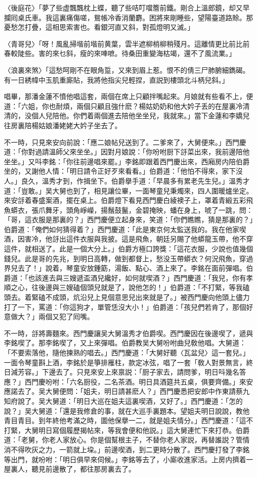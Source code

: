 〈後庭花〉「夢了些虚飄飄枕上蝶，聽了些咭叮噹簷前鐵。剛合上溫郎鏡，却又早攔囘桌氏車。我這裏痛傷嗟，鴛帳冷香消蘭麝。困將來剛睡些，望陽臺道路賒。那憂愁怎打疊，這相思索害也。看銀河直又斜，對孤燈明又滅。」

〈青哥兒〉「呀！風亂掃堦前堦前黄葉，雲半遮柳梢柳稍殘月。這離情更比前比前春較陡些。害的來乜斜，瘦的來唓嗻。待桑田重變海枯竭，還不了風流業。」

〈浪裏來煞〉「這愁呵剛不在眼角踅，又來到眉上惹。恨不的倩三尸肺腑細鐫碣。有一日綉幃中玉肌重廝貼，我將他指尖兒輕捏，直説到樓頭北斗柄兒斜。」

唱畢，那潘金蓮不憤他唱這套，兩個在席上只顧拌嘴起來。月娘就有些看不上，便道：「六姐，你也耐煩，兩個只顧且強什麽？楊姑奶奶和他大妗子丢的在屋裏冷清清的，没個人兒陪他。你們着兩個進去陪他坐坐兒，我就來。」當下金蓮和李嬌兒往房裏陪楊姑娘潘姥姥大妗子坐去了。

不一時，只見來安向前說：「應二娘帖兒送到了。二爹來了，大舅便來。」西門慶道：「你對過請溫師父來坐坐。」因對月娘說：「你吩咐厨下㧱菜出來，我前邊陪他坐坐。」又呌李銘：「你往前邊唱來罷。」李銘即跟着西門慶出來，西廂房内陪伯爵坐的，又謝他人情：「明日請令正好歹來看看。」伯爵道：「他怕不得來，家下沒人。」良久，溫秀才到，作揖坐下。伯爵擧手道：「早晨多有累老先生兒。」溫秀才道：「豈敢。」吴大舅也到了，相見讓位畢，一面琴童兒秉燭來，四人圍暖爐坐定。來安㧱着春盛案酒，擺在桌上。伯爵燈下看見西門慶白綾襖子上，罩着青緞五彩飛魚蟒衣，張爪舞牙，頭角崢嶸，揚鬚鼓鬣，金碧掩映，蟠在身上，唬了一跳，問：「哥，這衣服是那裏的？」西門慶便立起身來，笑道：「你們瞧瞧，猜是那裏的？」伯爵道：「俺們如何猜得着？」西門慶道：「此是東京何太監送我的。我在他家喫酒，因害冷，他㧱出這件衣服與我披。這是飛魚，朝廷另賜了他蟒龍玉帶，他不穿這件，就相送了。此是一個大分上。」伯爵方極口誇獎：「這花衣服，少說也值幾個錢兒。此是哥的先兆，到明日高轉，做到都督上，愁没玉帶蟒衣？何況飛魚，穿過界兒去了！」說着，琴童安放鍾筯，湯飯、點心、酒上來了。李銘在面前彈唱。伯爵道：「也該進去與三嫂遞盃酒兒纔好，如何就喫酒？」西門慶道：「我兒，你有孝順之心，往後邊與三嫂磕個頭兒就是了，說他怎的！」伯爵道：「不打緊，等我磕頭去。着緊磕不成頭，炕沿兒上見個意思兒出來就是了。」被西門慶向他頭上儘力打了一下，罵道：「你這狗才，單管恁沒大小！」伯爵道：「孩兒們若肯了，那個好意做大？」兩個又犯了囘嘴。

不一時，㧱將壽麵來。西門慶讓吴大舅溫秀才伯爵喫。西門慶因在後邊喫了，遞與李銘喫了。那李銘喫了，又上來彈唱。伯爵教吴大舅吩咐曲兒敎他唱。大舅道：「不要索落他，隨他揀熟的唱去。」西門慶道：「大舅好聽〈瓦盆兒〉這一套兒。」一面令琴童斟上酒，李銘於是箏排雁柱，款定冰弦，唱了一套「敎人對景無言，終日減芳容。」下邊去了。只見來安上來禀説：「厨子家去，請問爹，明日呌幾名答應？」西門慶吩咐：「六名厨役，二名茶酒。明日具酒筵共五桌，俱要齊備。」來安應諾去了。吴大舅便問：「姐夫，明日請甚麽人？」西門慶悉把安郎中作東請蔡九知府說了。吴大舅道：「明日大巡在姐夫這裏喫酒，又好了。」西門慶道：「怎的說？」吴大舅道：「還是我修倉的事，就在大巡手裏題本。望姐夫明日說說，教他青目青目。到年終他考滿之時，圖他保擧一二，就是姐夫情分。」西門慶道：「這不打緊，大舅明日寫個履歷揭帖來，等我會便和他説。」這大舅連忙下來打恭。伯爵道：「老舅，你老人家放心。你是個幫根主子，不替你老人家説，再替誰説？管情消不得吹灰之力，一箭就上垜。」前邊喫酒，到二更時分散了。西門慶打發了李銘等出門，就吩咐：「明日俱早來伺候。」李銘等去了，小廝收進家活。上房内擠着一屋裏人，聽見前邊散了，都往那房裏去了。

